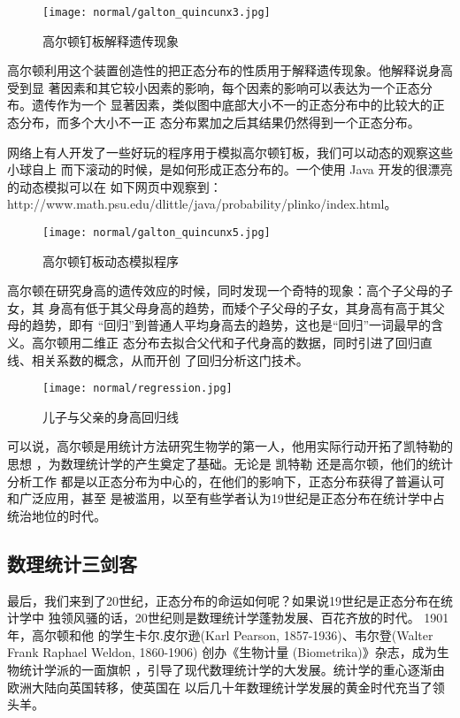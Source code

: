 \begin{figure}[ht]
\centering
\texttt{[image: normal/galton\_quincunx3.jpg]}
\caption{高尔顿钉板解释遗传现象}
\end{figure}

高尔顿利用这个装置创造性的把正态分布的性质用于解释遗传现象。他解释说身高受到显
著因素和其它较小因素的影响，每个因素的影响可以表达为一个正态分布。遗传作为一个
显著因素，类似图中底部大小不一的正态分布中的比较大的正态分布，而多个大小不一正
态分布累加之后其结果仍然得到一个正态分布。

网络上有人开发了一些好玩的程序用于模拟高尔顿钉板，我们可以动态的观察这些小球自上
而下滚动的时候，是如何形成正态分布的。一个使用 Java 开发的很漂亮的动态模拟可以在
如下网页中观察到：http://www.math.psu.edu/dlittle/java/probability/plinko/index.html。

\begin{figure}[ht]
\centering
\texttt{[image: normal/galton\_quincunx5.jpg]}
\caption{高尔顿钉板动态模拟程序}
\end{figure}

高尔顿在研究身高的遗传效应的时候，同时发现一个奇特的现象：高个子父母的子女，其
身高有低于其父母身高的趋势，而矮个子父母的子女，其身高有高于其父母的趋势，即有
“回归”到普通人平均身高去的趋势，这也是“回归”一词最早的含义。高尔顿用二维正
态分布去拟合父代和子代身高的数据，同时引进了回归直线、相关系数的概念，从而开创
了回归分析这门技术。

\begin{figure}[ht]
\centering
\texttt{[image: normal/regression.jpg]}
\caption{儿子与父亲的身高回归线}
\end{figure}

可以说，高尔顿是用统计方法研究生物学的第一人，他用实际行动开拓了凯特勒的思想
，为数理统计学的产生奠定了基础。无论是 凯特勒 还是高尔顿，他们的统计分析工作
都是以正态分布为中心的，在他们的影响下，正态分布获得了普遍认可和广泛应用，甚至
是被滥用，以至有些学者认为19世纪是正态分布在统计学中占统治地位的时代。

\subsection{数理统计三剑客}

最后，我们来到了20世纪，正态分布的命运如何呢？如果说19世纪是正态分布在统计学中
独领风骚的话，20世纪则是数理统计学蓬勃发展、百花齐放的时代。 1901年，高尔顿和他
的学生卡尔.皮尔逊(Karl Pearson, 1857-1936)、韦尔登(Walter Frank Raphael
Weldon, 1860-1906) 创办《生物计量 (Biometrika)》杂志，成为生物统计学派的一面旗帜
，引导了现代数理统计学的大发展。统计学的重心逐渐由欧洲大陆向英国转移，使英国在
以后几十年数理统计学发展的黄金时代充当了领头羊。

